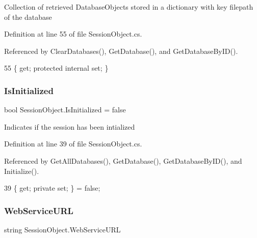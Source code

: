 Collection of retrieved Database\+Objects stored in a dictionary with key filepath of the database 



Definition at line 55 of file Session\+Object.\+cs.



Referenced by Clear\+Databases(), Get\+Database(), and Get\+Database\+By\+I\+D().


\begin{DoxyCode}
55 \{ \textcolor{keyword}{get}; \textcolor{keyword}{protected} \textcolor{keyword}{internal} \textcolor{keyword}{set}; \}
\end{DoxyCode}
\mbox{\label{class_session_object_ae0885b9054fc3ce287307ac16ff69990}} 
\subsubsection{\texorpdfstring{Is\+Initialized}{IsInitialized}}
{\footnotesize\ttfamily bool Session\+Object.\+Is\+Initialized = false\hspace{0.3cm}{\ttfamily [get]}}



Indicates if the session has been intialized 



Definition at line 39 of file Session\+Object.\+cs.



Referenced by Get\+All\+Databases(), Get\+Database(), Get\+Database\+By\+I\+D(), and Initialize().


\begin{DoxyCode}
39 \{ \textcolor{keyword}{get}; \textcolor{keyword}{private} \textcolor{keyword}{set}; \} = \textcolor{keyword}{false};
\end{DoxyCode}
\mbox{\label{class_session_object_a697c071c812fbf7ad1166b896fb44c16}} 
\subsubsection{\texorpdfstring{Web\+Service\+U\+RL}{WebServiceURL}}
{\footnotesize\ttfamily string Session\+Object.\+Web\+Service\+U\+RL\hspace{0.3cm}{\ttfamily [get]}}



